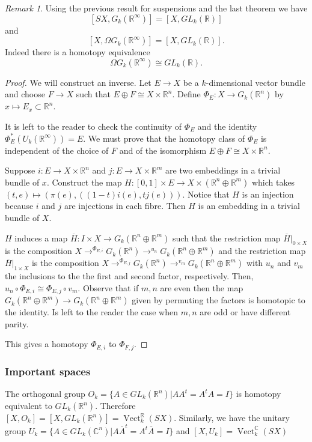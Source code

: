 \documentclass[a4paper,10pt]{article}
\theoremstyle{plain}%
\theoremstyle{definition}
\theoremstyle{remark}
\newtheorem{rem}{Remark}
\newcommand{\RR}{\mathbb{R}}
\newcommand{\CC}{\mathbb{C}}
\DeclareMathOperator{\Vect}{Vect}
\begin{document}
\begin{rem}
Using the previous result for suspensions and the last theorem we have
\[
[SX, G_k(\RR^\infty)] = [X, GL_k(\RR)]
\]
and
\[
[X, \Omega G_k(\RR^\infty)] = [X, GL_k(\RR)].
\]
Indeed there is a homotopy equivalence
\[
\Omega G_k(\RR^\infty) \cong GL_k(\RR).
\]
\end{rem}

\begin{proof}
We will construct an inverse. Let $E\to X$ be a $k$-dimensional vector bundle and choose $F \to X$ such that $E\oplus F \cong X\times \RR^n.$
Define $\Phi_E: X\to G_k(\RR^ n)$ by $x\mapsto E_x\subset \RR^n.$

It is left to the reader to check the continuity of $\Phi_E$ and the identity $\Phi_E^*(U_k(\RR^\infty))= E.$ We must prove that the homotopy class of $\Phi_E$ is independent of the choice of $F$ and of the isomorphism $E\oplus F \cong X\times \RR^n.$

Suppose $i:E\to X\times\RR^n$ and $j:E\to X\times\RR^m$ are two embeddings in a trivial bundle of $x$. Construct the map
$H:[0,1]\times E\to X\times(\RR^n\oplus\RR^m)$ which takes $(t,e)\mapsto (\pi(e),((1-t)i(e),tj(e))).$ Notice that $H$ is an injection because $i$ and $j$ are injections in each fibre. Then $H$ is an embedding in a trivial bundle of $X$.

$H$ induces a map $\overline{H}: I\times X \to G_k(\RR^n\oplus\RR^m)$ such that
the restriction map $\overline{H}|_{{0}\times X}$ is the composition $X \to^{\Phi_{E,i}} G_k(\RR^n) \to^{u_n}  G_k(\RR^n\oplus\RR^m)$ and the restriction map $\overline{H}|_{{1}\times X}$ is the composition $X \to^{\Phi_{E,j}} G_k(\RR^n) \to^{v_m}  G_k(\RR^n\oplus\RR^m)$ with $u_n$ and $v_m$ the inclusions to the the first and second factor, respectively. Then, $u_n\circ \Phi_{E,i} \cong \Phi_{E,j} \circ v_m.$ Observe that if $m,n$ are even then the map $G_k(\RR^n\oplus\RR^m) \to G_k(\RR^n\oplus\RR^m)$ given by permuting the factors is homotopic to the identity. Is left to the reader the case when $m,n$ are odd or have different parity.

This gives a homotopy $\Phi_{E,i}$ to $\Phi_{F,j}.$
\end{proof}

\subsubsection{Important spaces}

The orthogonal group $O_k = \{ A\in GL_k(\RR^n) | AA^t = A^tA = I\}$ is homotopy equivalent to $GL_k(\RR^n).$ Therefore $[X,O_k]=[X,GL_k(\RR^n)] = \Vect_k^\RR(SX).$ Similarly, we have the unitary group $U_k = \{ A\in GL_k(\CC^n) | A\overline{A}^t = A^t\overline{A} = I\}$ and $[X,U_k]= \Vect_k^\CC(SX)$
\end{document}

